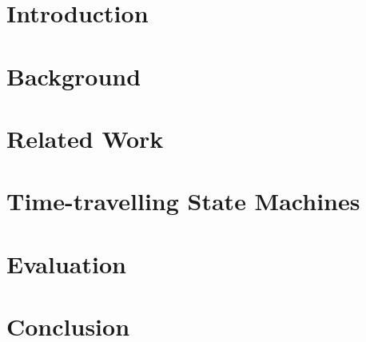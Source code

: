 \documentclass[draft,final]{vutinfth} %
\begin{document}
\tableofcontents %

\mainmatter

\chapter{Introduction}


\chapter{Background}


\chapter{Related Work}


\chapter{Time-travelling State Machines}


\chapter{Evaluation}


\chapter{Conclusion}


% 

% 

\backmatter

\listoffigures %

\cleardoublepage %
\listoftables %
\end{document}
